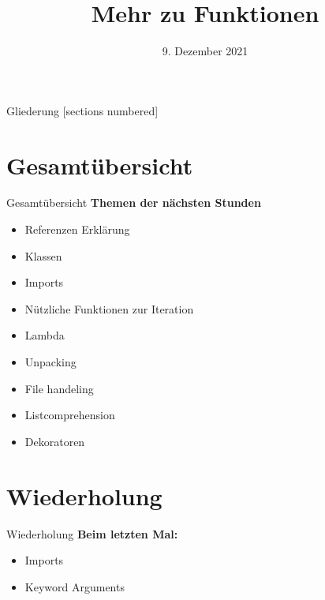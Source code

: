 



\title{Mehr zu Funktionen}
\date{9. Dezember 2021}


	
\maketitle

\begin{frame}{Gliederung}
	[sections numbered]
	\tableofcontents
\end{frame}

\section*{Gesamtübersicht}
\begin{frame}{Gesamtübersicht}
	\textbf{Themen der nächsten Stunden}
	\begin{itemize}
		\item Referenzen Erklärung
		\item  Klassen
		\item Imports
		\item Nützliche Funktionen zur Iteration
		\item \alert{Lambda}
		\item \alert{Unpacking}
		\item File handeling
		\item Listcomprehension
		\item Dekoratoren
	\end{itemize}
\end{frame}

\section{Wiederholung}
\begin{frame}{Wiederholung}
	\textbf{Beim letzten Mal:}
	\begin{itemize}
		\item Imports
		
		
		\item Keyword Arguments
		
	\end{itemize}	
\end{frame}

